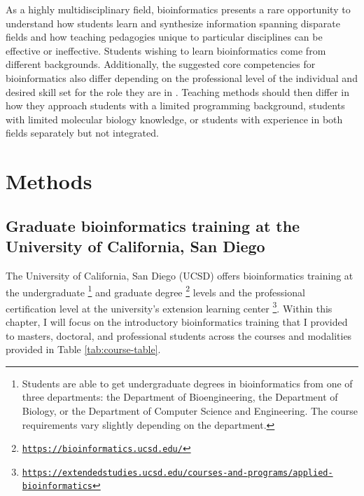 As a highly multidisciplinary field, bioinformatics presents a rare opportunity to understand how students learn and synthesize information spanning disparate fields and how teaching pedagogies unique to particular disciplines can be effective or ineffective. Students wishing to learn bioinformatics come from different backgrounds. Additionally, the suggested core competencies for bioinformatics also differ depending on the professional level of the individual and desired skill set for the role they are in \cite{tan2009,rubinstein2014,attwood2019,zhan2019,labov2010,mulder2018}. Teaching methods should then differ in how they approach students with a limited programming background, students with limited molecular biology knowledge, or students with experience in both fields separately but not integrated.  

\section{Methods}

\subsection{Graduate bioinformatics training at the University of California, San Diego}

The University of California, San Diego (UCSD) offers bioinformatics training at the undergraduate \footnote{Students are able to get undergraduate degrees in bioinformatics from one of three departments: the Department of Bioengineering, the Department of Biology, or the Department of Computer Science and Engineering. The course requirements vary slightly depending on the department.} and graduate degree \footnote{\href{https://bioinformatics.ucsd.edu/}{\texttt{https://bioinformatics.ucsd.edu/}}} levels and the professional certification level at the university's extension learning center \footnote{\href{https://extendedstudies.ucsd.edu/courses-and-programs/applied-bioinformatics}{\texttt{https://extendedstudies.ucsd.edu/courses-and-programs/applied-bioinformatics}}}. Within this chapter, I will focus on the introductory bioinformatics training that I provided to masters, doctoral, and professional students across the courses and modalities provided in Table \ref{tab:course-table}. 

